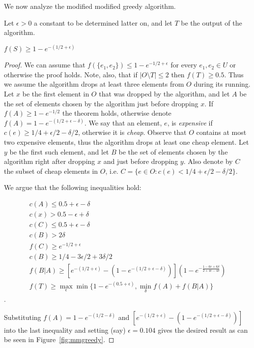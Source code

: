 We now analyze the modified modified greedy algorithm.

Let $\epsilon > 0$ a constant to be determined latter on, and let $T$ be the output of 
the algorithm.

\begin{theorem}
$f(S) \geq 1 - e^{-(1/2 + \epsilon)}$
\end{theorem}

\begin{proof}
We can assume that $f(\{e_1, e_2\}) \leq 1 - e^{-1/2 + \epsilon}$ 
for every $e_1, e_2 \in U$ or otherwise the proof holds.
Note, also, that if $|O \setminus T| \leq 2$ then $f(T) \geq 0.5$.
Thus we assume the algorithm drops at least three elements from $O$ during its running.
Let $x$ be the first element in $O$ that was dropped by the algorithm, 
and let $A$ be the set of elements chosen by the algorithm just before dropping $x$.
If $f(A) \geq 1 - e^{-1/2}$ the theorem holds, 
otherwise denote $f(A) = 1 - e^{-(1/2 + \epsilon - \delta)}$.
We say that an element, $e$, is \emph{expensive} if $c(e) \ge 1/4 + \epsilon/2 - \delta/2$, 
otherwise it is \emph{cheap}.
Observe that $O$ contains at most two expensive elements, thus the algorithm drops 
at least one cheap element. 
Let $y$ be the first such element, and let $B$ be the set of elements chosen by the 
algorithm right after dropping $x$ and just before dropping $y$.
Also denote by $C$ the subset of cheap elements in $O$, 
i.e. $C = \{e \in O : c(e) < 1/4 + \epsilon/2 - \delta/2\}$.

We argue that the following inequalities hold:

\begin{align}
c(A) \leq 0.5 + \epsilon - \delta 
\\
c(x) > 0.5 -\epsilon + \delta
\\
c(C) \leq 0.5 + \epsilon - \delta
\\
c(B) > 2\delta
\\
f(C) \ge e^{-1/2 + \epsilon}
\\
c(B) \ge 1/4 - 3\epsilon/2 + 3\delta/2
\\
f(B|A) \ge \left[
e^{-(1/2 + \epsilon)}
- (1 - e^{-(1/2 + \epsilon - \delta)})
\right]
(1-e^{-\frac{1-6\epsilon+6\delta}{2+4\epsilon-4\delta}})
\\
f(T) \geq \max_\epsilon \min \{1 - e^{-(0.5 + \epsilon)}, \min_{\delta} f(A) + f(B|A)\}
\end{align}
.

Substituting $f(A) = 1 - e^{-(1/2 - \delta)}$ 
and $\left[
e^{-(1/2 + \epsilon)}
- (1 - e^{-(1/2 + \epsilon - \delta)})
\right]$
into the last inequality and setting (say) $\epsilon = 0.104$ gives the desired result 
as can be seen in Figure~\ref{fig:mmgreedy}.

\end{proof}

